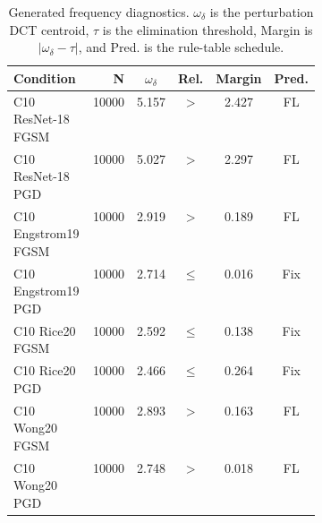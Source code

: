 \begin{table}[t]
\caption{Generated frequency diagnostics. \(\omega_\delta\) is the perturbation DCT centroid, \(\tau\) is the elimination threshold, Margin is \(|\omega_\delta-\tau|\), and Pred. is the rule-table schedule.}
\label{tab:frequency-diagnostics}
\centering
\tiny
{\setlength{\tabcolsep}{1.6pt}
\begin{tabular}{@{}p{0.40\linewidth}rcccc@{}}
\hline
Condition & N & \(\omega_\delta\) & Rel. & Margin & Pred. \\
\hline
C10 ResNet-18 FGSM & 10000 & 5.157 & \(>\) & 2.427 & FL \\
C10 ResNet-18 PGD & 10000 & 5.027 & \(>\) & 2.297 & FL \\
C10 Engstrom19 FGSM & 10000 & 2.919 & \(>\) & 0.189 & FL \\
C10 Engstrom19 PGD & 10000 & 2.714 & \(\le\) & 0.016 & Fix \\
C10 Rice20 FGSM & 10000 & 2.592 & \(\le\) & 0.138 & Fix \\
C10 Rice20 PGD & 10000 & 2.466 & \(\le\) & 0.264 & Fix \\
C10 Wong20 FGSM & 10000 & 2.893 & \(>\) & 0.163 & FL \\
C10 Wong20 PGD & 10000 & 2.748 & \(>\) & 0.018 & FL \\
\hline
\end{tabular}
}
\end{table}
